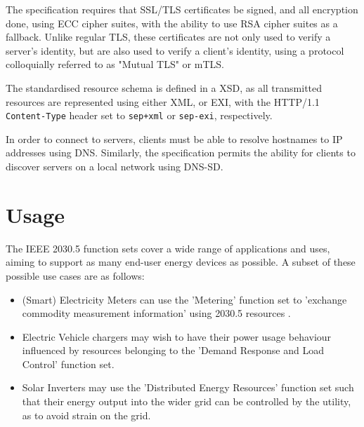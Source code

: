 The specification requires that SSL/TLS certificates be signed, and all encryption done, using ECC cipher suites, with the ability to use RSA cipher suites as a fallback. Unlike regular TLS, these certificates are not only used to verify a server's identity, but are also used to verify a client's identity, using a protocol colloquially referred to as "Mutual TLS" or mTLS.

The standardised resource schema is defined in a XSD, as all transmitted resources are represented using either XML, or EXI, with the HTTP/1.1 \texttt{Content-Type} header set to \texttt{sep+xml} or \texttt{sep-exi}, respectively.

In order to connect to servers, clients must be able to resolve hostnames to IP addresses using DNS. Similarly, the specification permits the ability for clients to discover servers on a local network using DNS-SD.

\section{Usage}
The IEEE 2030.5 function sets cover a wide range of applications and uses, aiming to support as many end-user energy devices as possible. A subset of these possible use cases are as follows:
\begin{itemize}
    \item (Smart) Electricity Meters can use the 'Metering' function set to 'exchange commodity measurement information' using 2030.5 resources \cite{IEEE2030.5}. 
    \item Electric Vehicle chargers may wish to have their power usage behaviour influenced by resources belonging to the 'Demand Response and Load Control' function set.
    \item Solar Inverters may use the 'Distributed Energy Resources' function set such that their energy output into the wider grid can be controlled by the utility, as to avoid strain on the grid.
\end{itemize}
